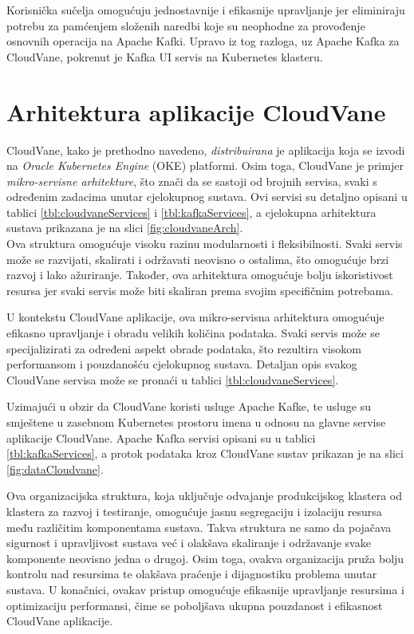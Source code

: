 \documentclass[times, utf8, diplomski]{fer}
\begin{document}
Korisnička sučelja omogućuju jednostavnije i efikasnije upravljanje jer eliminiraju potrebu za pamćenjem složenih naredbi koje su neophodne za provođenje osnovnih operacija na Apache Kafki. Upravo iz tog razloga, uz Apache Kafka za CloudVane, pokrenut je Kafka UI servis na Kubernetes klasteru.

\section{Arhitektura aplikacije CloudVane}
\label{sec:architecture}

CloudVane, kako je prethodno navedeno, \emph{distribuirana} je aplikacija koja se izvodi na \emph{Oracle Kubernetes Engine} (OKE) platformi. Osim toga, CloudVane je primjer \emph{mikro-servisne arhitekture}, što znači da se sastoji od brojnih servisa, svaki s određenim zadacima unutar cjelokupnog sustava. Ovi servisi su detaljno opisani u tablici \ref{tbl:cloudvaneServices} i \ref{tbl:kafkaServices}, a cjelokupna arhitektura sustava prikazana je na slici \ref{fig:cloudvaneArch}.\\

Ova struktura omogućuje visoku razinu modularnosti i fleksibilnosti. Svaki servis može se razvijati, skalirati i održavati neovisno o ostalima, što omogućuje brzi razvoj i lako ažuriranje. Također, ova arhitektura omogućuje bolju iskoristivost resursa jer svaki servis može biti skaliran prema svojim specifičnim potrebama.

U kontekstu CloudVane aplikacije, ova mikro-servisna arhitektura omogućuje efikasno upravljanje i obradu velikih količina podataka. Svaki servis može se specijalizirati za određeni aspekt obrade podataka, što rezultira visokom performansom i pouzdanošću cjelokupnog sustava. Detaljan opis svakog CloudVane servisa može se pronaći u tablici \ref{tbl:cloudvaneServices}.

Uzimajući u obzir da CloudVane koristi usluge Apache Kafke, te usluge su smještene u zasebnom Kubernetes prostoru imena u odnosu na glavne servise aplikacije CloudVane. Apache Kafka servisi opisani su u tablici \ref{tbl:kafkaServices}, a protok podataka kroz CloudVane sustav prikazan je na slici \ref{fig:dataCloudvane}.

Ova organizacijska struktura, koja uključuje odvajanje produkcijskog klastera od klastera za razvoj i testiranje, omogućuje jasnu segregaciju i izolaciju resursa među različitim komponentama sustava. Takva struktura ne samo da pojačava sigurnost i upravljivost sustava već i olakšava skaliranje i održavanje svake komponente neovisno jedna o drugoj. Osim toga, ovakva organizacija pruža bolju kontrolu nad resursima te olakšava praćenje i dijagnostiku problema unutar sustava. U konačnici, ovakav pristup omogućuje efikasnije upravljanje resursima i optimizaciju performansi, čime se poboljšava ukupna pouzdanost i efikasnost CloudVane aplikacije.
\end{document}
